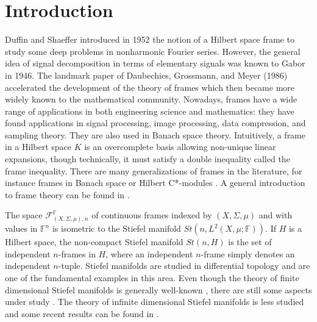 \documentclass[a4paper,12pt]{article}
\theoremstyle{plain}
\theoremstyle{definition}
\theoremstyle{remark}
\begin{document}
\section{Introduction}

Duffin and Shaeffer introduced in 1952 \cite{DuffinSchaeffer} the notion of a Hilbert space frame to study some deep problems in nonharmonic Fourier series. However, the general idea of signal decomposition in terms of elementary signals was known to Gabor \cite{Gabor} in 1946. The landmark paper of Daubechies, Grossmann, and Meyer \cite{DaubechiesGrossmannMeyer} (1986) accelerated the development of the theory of frames which then became more widely known to the mathematical community. Nowadays, frames have a wide range of applications in both engineering science and mathematics: they have found applications in signal processing, image processing, data compression, and sampling theory. They are also used in Banach space theory. Intuitively, a frame in a Hilbert space $K$ is an overcomplete basis allowing non-unique linear expansions, though technically, it must satisfy a double inequality called the frame inequality. There are many generalizations of frames in the literature, for instance frames in Banach space \cite{CasazzaHanLarson} or Hilbert C*-modules \cite{FrankLarson}. A general introduction to frame theory can be found in \cite{Casazza, Christensen}.

The space $\mathcal{F}_{(X,\Sigma,\mu),n}^\mathbb{F}$ of continuous frames indexed by $(X,\Sigma,\mu)$ and with values in $\mathbb{F}^n$ is isometric to the Stiefel manifold $St(n,L^2(X,\mu;\mathbb{F}))$. If $H$ is a Hilbert space, the non-compact Stiefel manifold $St(n,H)$ is the set of independent $n$-frames in $H$, where an independent $n$-frame simply denotes an independent $n$-tuple. Stiefel manifolds are studied in differential topology and are one of the fundamental examples in this area. Even though the theory of finite dimensional Stiefel manifolds is generally well-known \cite{James, Hatcher, Husemoller}, there are still some aspects under study \cite{Henkel, JurdjevicMarkinaLeite}. The theory of infinite dimensional Stiefel manifolds is less studied and some recent results can be found in \cite{BardelliMennucci, HarmsMennucci}.
\end{document}
